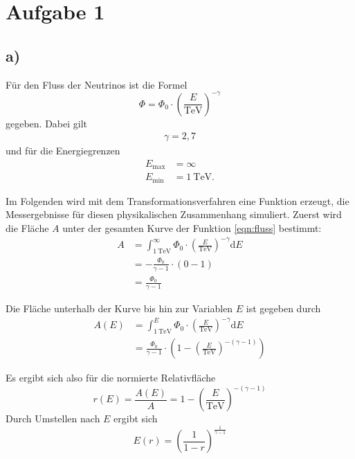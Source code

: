 \newpage
\section{Aufgabe 1}
\label{sec:a1}

\subsection{a)}
\label{subsec:a1a}
Für den Fluss der Neutrinos ist die Formel
\\
\begin{equation}
  \label{eqn:fluss}
  \Phi = \Phi_{0} \cdot \left( \frac{E}{\si{\tera\electronvolt}} \right)^{-\gamma}
\end{equation}
gegeben. Dabei gilt
\\
\begin{align*}
  \gamma = 2,7
\end{align*}
und für die Energiegrenzen
\\
\begin{align*}
  E_\text{max} &= \infty\\
  E_\text{min} &= \SI{1}{\tera\electronvolt}.
\end{align*}

Im Folgenden wird mit dem Transformationsverfahren eine Funktion erzeugt, die Messergebnisse
für diesen physikalischen Zusammenhang simuliert.
Zuerst wird die Fläche $A$ unter der gesamten Kurve der Funktion \eqref{eqn:fluss} bestimmt:
\\
\begin{align}
  A &= \int_{\SI{1}{\tera\electronvolt}}^{\infty} \Phi_{0}
  \cdot \left( \frac{E}{\si{\tera\electronvolt}} \right)^{-\gamma} \mathrm{d}E\\
  &= - \frac{\Phi_{0}}{\gamma - 1} \cdot \left( 0 - 1 \right)\\
  &= \frac{\Phi_{0}}{\gamma - 1}
\end{align}

Die Fläche unterhalb der Kurve bis hin zur Variablen $E$ ist gegeben durch
\\
\begin{align}
  A(E) &= \int_{\SI{1}{\tera\electronvolt}}^{E} \Phi_{0} \cdot \left( \frac{E}{\si{\tera\electronvolt}}
  \right)^{-\gamma} \mathrm{d}E\\
  &= \frac{\Phi_{0}}{\gamma - 1} \cdot \left( 1 - \left(\frac{E}{\si{\tera\electronvolt}}
  \right)^{-(\gamma -1)} \right)
\end{align}

Es ergibt sich also für die normierte Relativfläche
\\
\begin{equation}
  \label{eqn:relat}
  r(E) = \frac{A(E)}{A} = 1 - \left(\frac{E}{\si{\tera\electronvolt}}\right)^{-(\gamma - 1)}
\end{equation}
Durch Umstellen nach $E$ ergibt sich
\\
\begin{equation}
  \label{eqn:r}
  E(r) = \left( \frac{1}{1 - r} \right)^{\frac{1}{\gamma - 1}}
\end{equation}

